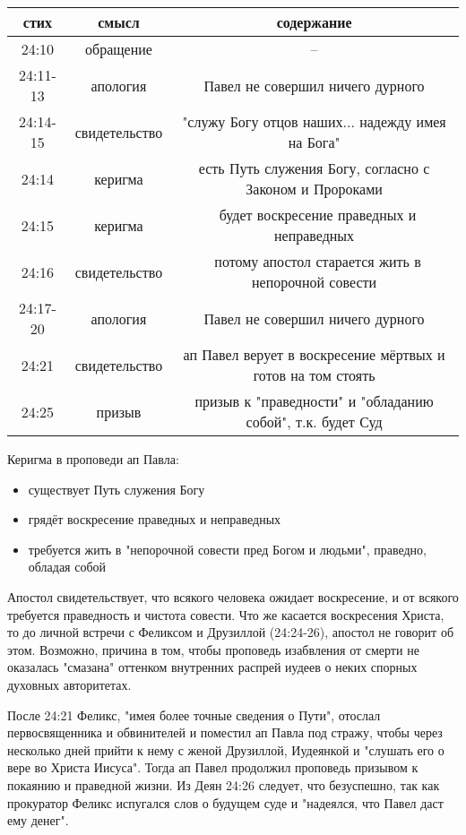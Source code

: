 \begin{center}
	\begin{tabular}{ |c|c|c| }
		\hline
		стих & смысл & содержание \\
		\hline\hline
		24:10 & обращение & – \\
		24:11-13 & апология & Павел не совершил ничего дурного \\
		24:14-15 & свидетельство & "служу Богу отцов наших... надежду имея на Бога" \\ 
		24:14 & керигма & есть Путь служения Богу, согласно с Законом и Пророками \\
		24:15 & керигма & будет воскресение праведных и неправедных \\
		24:16 & свидетельство & потому апостол старается жить в непорочной совести \\
		24:17-20 & апология & Павел не совершил ничего дурного \\
		24:21 & свидетельство & ап Павел верует в воскресение мёртвых и готов на том стоять \\
		24:25 & призыв & призыв к "праведности" и "обладанию собой", т.к. будет Суд \\
		\hline
	\end{tabular}
\end{center}

Керигма в проповеди ап Павла:
\begin{itemize}
	\item существует Путь служения Богу
	\item грядёт воскресение праведных и неправедных
	\item требуется жить в "непорочной совести пред Богом и людьми", праведно, обладая собой
\end{itemize}


Апостол свидетельствует, что всякого человека ожидает воскресение, и от всякого требуется праведность и чистота совести.
Что же касается воскресения Христа, то до личной встречи с Феликсом и Друзиллой (24:24-26), апостол не говорит об этом.
Возможно, причина в том, чтобы проповедь изабвления от смерти не оказалась "смазана" оттенком внутренних распрей иудеев о неких спорных духовных авторитетах.

После 24:21 Феликс, "имея более точные сведения о Пути", отослал первосвященника и обвинителей и поместил ап Павла под стражу, чтобы через несколько дней прийти к нему с женой Друзиллой, Иудеянкой и "слушать его о вере во Христа Иисуса".
Тогда ап Павел продолжил проповедь призывом к покаянию и праведной жизни.
Из Деян 24:26 следует, что безуспешно, так как прокуратор Феликс испугался слов о будущем суде и "надеялся, что Павел даст ему денег".


